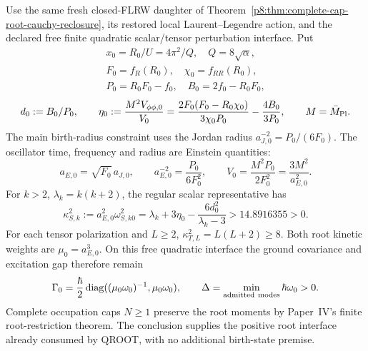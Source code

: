 \documentclass[12pt,a4paper]{article}
\begin{document}
\begin{corollary}
\label{p8:cor:v2109-positive-root-oscillators}
\label{p8:cor:v2186-cyclic-root-positive-oscillators}
Use the same fresh closed-FLRW daughter of
Theorem~\ref{p8:thm:complete-cap-root-cauchy-reclosure}, its restored local
Laurent--Legendre action, and the declared free finite quadratic
scalar/tensor perturbation interface. Put
\[
 \begin{gathered}
 x_0=R_0/U=4\pi^2/Q,\quad Q=8\sqrt\alpha,\\
 F_0=f_R(R_0),\quad \chi_0=f_{RR}(R_0),\\
 P_0=R_0F_0-f_0,\quad B_0=2f_0-R_0F_0,
 \end{gathered}
\]
\[
 d_0:=B_0/P_0,\qquad
 \eta_0:=\frac{M^2V_{\phi\phi,0}}{V_0}
 =\frac{2F_0(F_0-R_0\chi_0)}{3\chi_0P_0}-\frac{4B_0}{3P_0},
 \qquad M=\bar M_{\rm Pl}.
\]
The main birth-radius constraint uses the Jordan radius
$a_{J,0}^{-2}=P_0/(6F_0)$. The oscillator time, frequency and radius are
Einstein quantities:
\[
 a_{E,0}=\sqrt{F_0}\,a_{J,0},\qquad
 a_{E,0}^{-2}=\frac{P_0}{6F_0^2},\qquad
 V_0=\frac{M^2P_0}{2F_0^2}=\frac{3M^2}{a_{E,0}^2}.
\]
For $k>2$, $\lambda_k=k(k+2)$, the regular scalar representative has
\begin{equation}
\label{p8:eq:v2186-cyclic-root-scalar-frequency}
 \boxed{\kappa_{S,k}^2:=a_{E,0}^2\omega_{S,k0}^2
 =\lambda_k+3\eta_0-\frac{6d_0^2}{\lambda_k-3}
 >14.8916355>0.}
\end{equation}
For each tensor polarization and $L\ge2$,
$\kappa_{T,L}^2=L(L+2)\ge8$. Both root kinetic weights are
$\mu_0=a_{E,0}^3$. On this free quadratic interface the ground covariance and
excitation gap therefore remain
\[
 \Gamma_0=\frac\hbar2\operatorname{diag}
 ((\mu_0\omega_0)^{-1},\mu_0\omega_0),\qquad
 \Delta=\min_{\rm admitted\ modes}\hbar\omega_0>0.
\]
Complete occupation caps $N\ge1$ preserve the root moments by Paper~IV's
finite root-restriction theorem. The conclusion supplies the positive root
interface already consumed by QROOT, with no additional birth-state premise.
\end{corollary}
\end{document}
